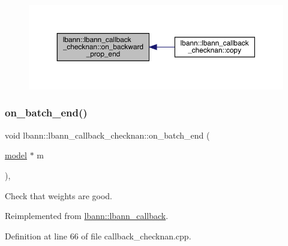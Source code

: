 \begin{figure}[H]
\begin{center}
\leavevmode
\includegraphics[width=350pt]{classlbann_1_1lbann__callback__checknan_a40d9a9fcc5849746570b99321e1c5488_icgraph}
\end{center}
\end{figure}
\mbox{\label{classlbann_1_1lbann__callback__checknan_a1d1b3b082aa49016e7b80e0f267575da}} 
\subsubsection{\texorpdfstring{on\+\_\+batch\+\_\+end()}{on\_batch\_end()}}
{\footnotesize\ttfamily void lbann\+::lbann\+\_\+callback\+\_\+checknan\+::on\+\_\+batch\+\_\+end (\begin{DoxyParamCaption}\item[{\hyperlink{classlbann_1_1model}{model} $\ast$}]{m }\end{DoxyParamCaption})\hspace{0.3cm}{\ttfamily [override]}, {\ttfamily [virtual]}}

Check that weights are good. 

Reimplemented from \hyperlink{classlbann_1_1lbann__callback_a895ca577e358601fcae5c04749f60535}{lbann\+::lbann\+\_\+callback}.



Definition at line 66 of file callback\+\_\+checknan.\+cpp.



